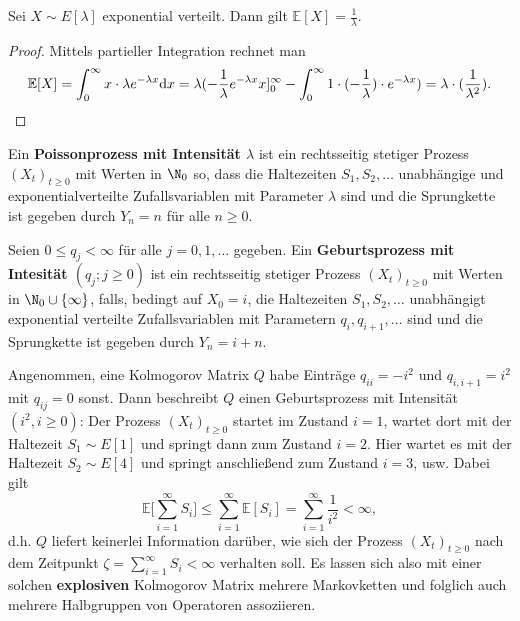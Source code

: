 \begin{bem}
Sei $X\sim E[\lambda]$ exponential verteilt. Dann gilt $\mathbb E[X]=\frac{1}{\lambda}$.
\end{bem}

\begin{proof}
Mittels partieller Integration rechnet man $$\mathbb E[X]=\int_0^\infty x\cdot \lambda e^{-\lambda x}\text dx = \lambda(-\frac{1}{\lambda}e^{-\lambda x}x]_0^\infty -\int_0^\infty 1\cdot(-\frac{1}{\lambda})\cdot e^{-\lambda x})=\lambda\cdot(\frac{1}{\lambda ^2}).$$
\end{proof}


\begin{konstr}[Poissonprozess]
  Ein \textbf{Poissonprozess mit Intensität $\lambda$} ist ein rechtsseitig stetiger Prozess $(X_t)_{t\geq0}$ mit Werten in $\N_0$ so, dass die Haltezeiten $S_1,S_2,\dots$ unabhängige und exponentialverteilte Zufallsvariablen mit Parameter $\lambda$ sind und die Sprungkette ist gegeben durch $Y_n=n$ für alle $n\geq 0$.
\end{konstr}


\begin{konstr}[Geburtsprozess]
  Seien $0\leq q_j<\infty$ für alle $j=0,1,\dots$ gegeben. Ein \textbf{Geburtsprozess mit Intesität $(q_j;j\geq0)$} ist ein rechtsseitig stetiger Prozess $(X_t)_{t\geq0}$ mit Werten in  $\N_0\cup\{\infty\}$, falls, bedingt auf $X_0=i$, die Haltezeiten $S_1,S_2,\dots$ unabhängigt exponential verteilte Zufallsvariablen mit Parametern $q_i,q_{i+1},\dots$ sind und die Sprungkette ist gegeben durch $Y_n=i+n$.
\end{konstr}

\begin{bsp}Angenommen, eine Kolmogorov Matrix $Q$ habe Einträge $q_{ii}=-i^2$ und $q_{i,i+1}=i^2$ mit $q_{ij}=0$ sonst. Dann beschreibt $Q$ einen Geburtsprozess mit Intensität $(i^2, i\geq0)$:  Der Prozess $(X_t)_{t\geq0}$ startet im Zustand $i=1$, wartet dort mit der Haltezeit $S_1\sim E[1]$ und springt dann zum Zustand $i=2$. Hier wartet es mit der Haltezeit $S_2\sim E[4]$ und springt anschließend zum Zustand $i=3$, usw. Dabei gilt $$\mathbb E\Big[\sum_{i=1}^\infty S_i\Big]\leq\sum_{i=1}^\infty \mathbb E[S_i]=\sum_{i=1}^\infty\frac{1}{i^2}< \infty,$$d.h. $Q$ liefert keinerlei Information darüber, wie sich der Prozess $(X_t)_{t\geq0}$ nach dem Zeitpunkt $\zeta=\sum_{i=1}^\infty S_i<\infty$ verhalten soll. Es lassen sich also mit einer solchen \textbf{explosiven} Kolmogorov Matrix mehrere Markovketten und folglich auch mehrere Halbgruppen von Operatoren assoziieren.
\end{bsp}



